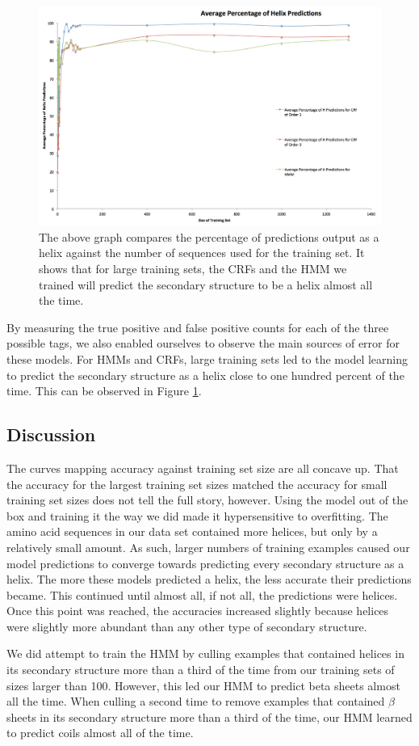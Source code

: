 \documentclass[11 pt, twocolumn]{article}
\begin{document}
\begin{figure}
\centering
\includegraphics[width = .5\textwidth]{Helix_Predictions.png}
\caption{The above graph compares the percentage of predictions output as a helix against the number of sequences used for the training set. It shows that for large training sets, the CRFs and the HMM we trained will predict the secondary structure to be a helix almost all the time.}
\label{fig:helixPred}
\end{figure}

By measuring the true positive and false positive counts for each of the three possible tags, we also enabled ourselves to observe the main sources of error for these models. For  HMMs and CRFs, large training  sets led to the model learning  to predict  the secondary structure as a helix close to one hundred percent of the time. This can be observed  in Figure \ref{fig:helixPred}. 

\subsection{Discussion}

The curves mapping accuracy against training set size are all concave up. That the accuracy for the largest training set sizes  matched the accuracy for small training set sizes does not tell the full story, however. Using the model out of the box and training it the way we did made it hypersensitive to overfitting. The amino acid sequences in our data set contained more helices, but only by a relatively small amount. As such, larger numbers of training examples caused our model predictions to converge towards predicting every secondary structure as a helix. The more these models predicted a helix, the less accurate their predictions became. This continued until almost all, if not all, the predictions were helices. Once this point was reached, the accuracies increased slightly because helices were slightly more abundant than any other type of secondary structure. 


We did attempt to train the HMM by culling examples that contained helices in its secondary structure more than a third of the time from our training sets of sizes larger than 100. However, this led our HMM to predict beta sheets almost all the time. When culling a second time to remove examples that contained $\beta$ sheets in its secondary structure more than a third of the time, our HMM learned to predict coils almost all of the time.
\end{document}
